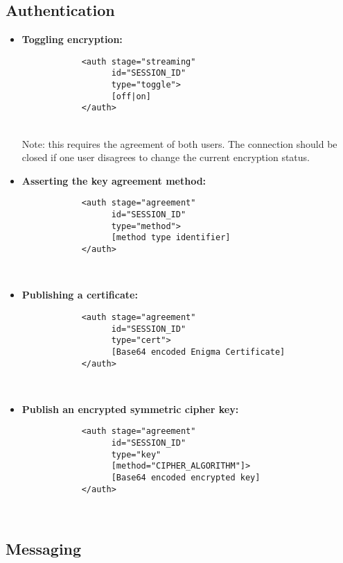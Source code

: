 \subsection{Authentication}

\begin{itemize}
	\item \textbf{Toggling encryption:}
		\begin{verbatim}
			<auth stage="streaming"
			      id="SESSION_ID"
			      type="toggle">
			      [off|on]
			</auth>
		\end{verbatim} \\
		Note: this requires the agreement of both users. The connection should be closed if one user disagrees to change the current encryption status.
\end{itemize}

\begin{itemize}
	\item \textbf{Asserting the key agreement method:}
		\begin{verbatim}
			<auth stage="agreement"
			      id="SESSION_ID"
			      type="method">
			      [method type identifier]
			</auth>
		\end{verbatim} \\
\end{itemize}

\begin{itemize}
	\item \textbf{Publishing a certificate:}
		\begin{verbatim}
			<auth stage="agreement"
			      id="SESSION_ID"
			      type="cert">
			      [Base64 encoded Enigma Certificate]
			</auth>
		\end{verbatim} \\
\end{itemize}

\begin{itemize}
	\item \textbf{Publish an encrypted symmetric cipher key:}
		\begin{verbatim}
			<auth stage="agreement"
			      id="SESSION_ID"
			      type="key"
			      [method="CIPHER_ALGORITHM"]>
			      [Base64 encoded encrypted key]
			</auth>
		\end{verbatim} \\
\end{itemize}

\subsection{Messaging}

